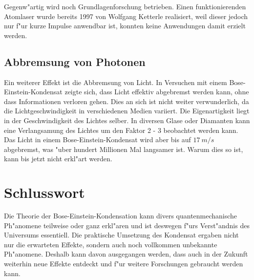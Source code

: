 \begin{refsection}
Gegenw"artig wird noch Grundlagenforschung betrieben. Einen funktionierenden Atomlaser wurde bereits 1997 von Wolfgang Ketterle realisiert, weil dieser jedoch nur f"ur kurze Impulse anwendbar ist, konnten keine Anwendungen damit erzielt werden. 

\subsection{Abbremsung von Photonen}

Ein weiterer Effekt ist die Abbremsung von Licht. In Versuchen mit einem Bose-Einstein-Kondensat zeigte sich, dass Licht effektiv abgebremst werden kann, ohne dass Informationen verloren gehen. Dies an sich ist nicht weiter verwunderlich, da die Lichtgeschwindigkeit in verschiedenen Medien variiert. Die Eigenartigkeit liegt in der Geschwindigkeit des Lichtes selber. In diversen Glase oder Diamanten kann eine Verlangsamung des Lichtes um den Faktor 2 - 3 beobachtet werden kann. Das Licht in einem Bose-Einstein-Kondensat wird aber bis auf $17~m/s$ abgebremst, was "uber hundert Millionen Mal langsamer ist. Warum dies so ist, kann bis jetzt nicht erkl"art werden. \cite{bose:SlowLight}

\section{Schlusswort}

Die Theorie der Bose-Einstein-Kondensation kann divers quantenmechanische Ph"anomene teilweise oder ganz erkl"aren und ist deswegen f"urs Verst"andnis des Universums essentiell. Die praktische Umsetzung des Kondensat ergaben nicht nur die erwarteten Effekte, sondern auch noch vollkommen unbekannte Ph"anomene. Deshalb kann davon ausgegangen werden, dass auch in der Zukunft weiterhin neue Effekte entdeckt und f"ur weitere Forschungen gebraucht werden kann. 

\printbibliography[heading=subbibliography]
\end{refsection}



